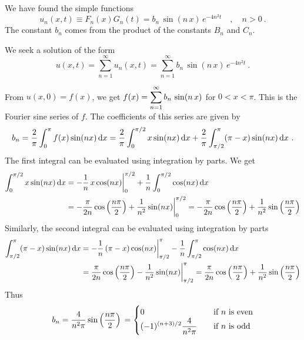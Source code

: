 \begin{egg}
We have found the simple functions
\[
u_n(x,t) \equiv F_n(x)G_n(t) = b_n\,\sin(n\,x)\, e^{-4n^2t} \quad , \quad
n>0 \ .
\]
The constant $b_n$ comes from the product of the constants $B_n$ and
$C_n$.

We seek a solution of the form
\[
u(x,t) = \sum_{n=1}^\infty u_n(x,t)
= \sum_{n=1}^\infty b_n\,\sin(n\,x)\, e^{-4n^2t} \  .
\]

From $u(x,0) = f(x)$, we get
$\displaystyle f(x) = \sum_{n=1}^\infty b_n\,\sin(n\,x)$
for $0<x<\pi$.  This is the Fourier sine series of $f$.  The coefficients of
this series are given by
\[
b_n = \frac{2}{\pi} \int_0^\pi f(x) \sin(nx)\,\mathrm{d}{x}
= \frac{2}{\pi} \int_0^{\pi/2} x\sin(nx) \,\mathrm{d}{x}
+ \frac{2}{\pi} \int_{\pi/2}^\pi (\pi-x) \sin(nx)\,\mathrm{d}{x} \ .
\]
The first integral can be evaluated using integration by parts.
We get
\begin{align*}
\int_0^{\pi/2} x\sin(nx) \,\mathrm{d}{x}
&= -\frac{1}{n}\,x\cos(nx)\bigg|_0^{\pi/2}
+ \frac{1}{n} \int_0^{\pi/2} \cos(nx) \,\mathrm{d}{x} \\
&= -\frac{\pi}{2n}\cos\left(\frac{n\pi}{2}\right)
+ \frac{1}{n^2} \sin(nx)\bigg|_0^{\pi/2}
= -\frac{\pi}{2n}\cos\left(\frac{n\pi}{2}\right) + \frac{1}{n^2}
\sin\left(\frac{n\pi}{2}\right)
\end{align*}
Similarly, the second integral can be evaluated using integration by
parts
\begin{align*}
\int_{\pi/2}^\pi (\pi-x) \sin(nx) \,\mathrm{d}{x}
&= -\frac{1}{n}\,(\pi-x)\cos(nx)\bigg|_{\pi/2}^\pi
- \frac{1}{n} \int_{\pi/2}^\pi \cos(nx) \,\mathrm{d}{x} \\
&= \frac{\pi}{2n}\cos\left(\frac{n\pi}{2}\right)
- \frac{1}{n^2} \sin(nx)\bigg|_{\pi/2}^\pi
= \frac{\pi}{2n}\cos\left(\frac{n\pi}{2}\right) + \frac{1}{n^2}
\sin\left(\frac{n\pi}{2}\right)
\end{align*}
Thus
\[
b_n = \frac{4}{n^2 \pi} \sin\left(\frac{n\pi}{2}\right) \\
=
\begin{cases}
0 & \quad \text{if $n$ is even} \\
\displaystyle (-1)^{(n+3)/2}\frac{4}{n^2 \pi} & \quad \text{if $n$ is odd}
\end{cases}
\]


\end{egg}

